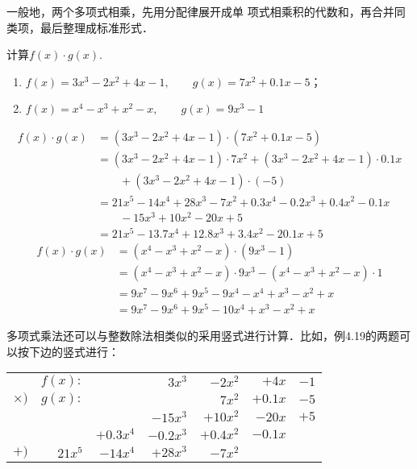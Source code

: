 一般地，两个多项式相乘，先用分配律展开成单
项式相乘积的代数和，再合并同类项，最后整理成标准形式．

\begin{example}
    计算$f(x)\cdot g(x)$.
    \begin{enumerate}
        \item $f(x)=3x^3-2x^2+4x-1,\qquad g(x)=7x^2+0.1x-5$；
        \item $f(x)=x^4-x^3+x^2-x,\qquad g(x)=9x^3-1$
    \end{enumerate} 
\end{example}

\begin{solution}
\[\begin{split}
        f(x)\cdot g(x)&=(3x^3-2x^2+4x-1)\cdot (7x^2+0.1x-5)\\
        &=(3x^3-2x^2+4x-1)\cdot 7x^2+(3x^3-2x^2+4x-1)\cdot 0.1x\\
        &\qquad +(3x^3-2x^2+4x-1)\cdot (-5)\\
&=21x^5-14x^4+28x^3-7x^2+0.3x^4-0.2x^3+0.4x^2-0.1x\\
&\qquad -15x^3+10x^2-20x+5\\
&=21x^5-13.7x^4+12.8x^3+3.4x^2-20.1x+5
    \end{split}\]
\[\begin{split}
    f(x)\cdot g(x)&=(x^4-x^3+x^2-x)\cdot (9x^3-1)\\
    &=(x^4-x^3+x^2-x)\cdot 9x^3-(x^4-x^3+x^2-x)\cdot 1\\
    &=9x^7-9x^6+9x^5-9x^4-x^4+x^3-x^2+x\\
    &=9x^7-9x^6+9x^5-10x^4+x^3-x^2+x
\end{split}\]
\end{solution}

多项式乘法还可以与整数除法相类似的采用竖式进行计算．比如，例4.19的两题可以按下边的竖式进行：
    \begin{center}
        \begin{tabular}{rrrrrrr}
           &    $f(x):$    &        &    $3x^3$    &    $-2x^2$    &    $+4x$    &    $-1$\\
        $\times)$    &    $g(x):$    &        &        &    $7x^2$    &    $+0.1x$    &    $-5$\\
        \hline
            &        &        &    $-15x^3$    &    $+10x^2$    &    $-20x$    &    $+5$\\
            &        &    $+0.3x^4$    &    $-0.2x^3$    &    $+0.4x^2$    &    $-0.1x$    &    \\
        $+)$    &    $21x^5$    &    $-14x^4$    &    $+28x^3$    &    $-7x^2$    &        &    \\
        \hline
        \end{tabular}
    \end{center}   


